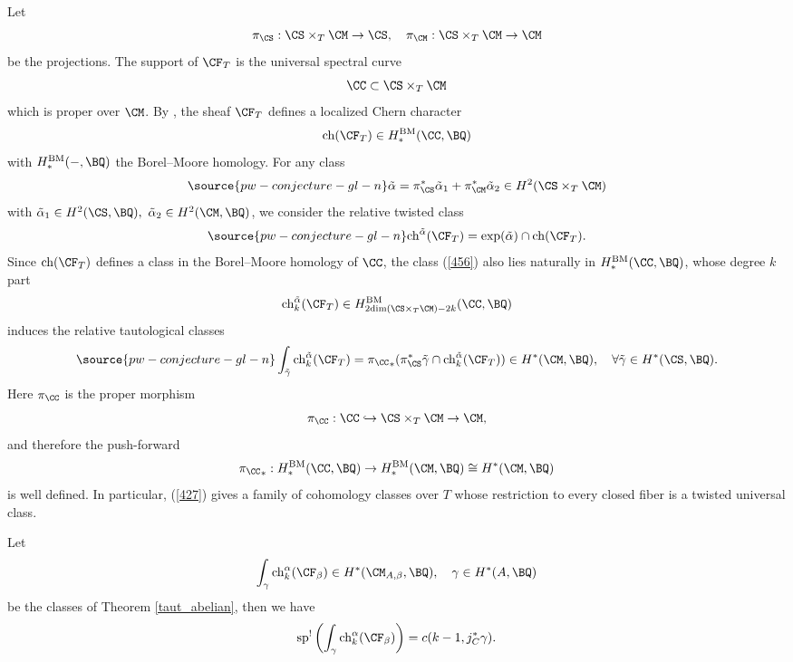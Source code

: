 Let
\[
\pi_\CS: \CS\times_T \CM \to \CS,\quad \pi_\CM: \CS\times_T \CM \to \CM
\]
be the projections. The support of $\CF_T$ is the universal spectral curve
\[
\CC \subset \CS\times_T \CM
\]
which is proper over $\CM$. By \cite{BFM}, the sheaf $\CF_T$ defines a localized Chern character
\[
\mathrm{ch}(\CF_T) \in H^{\mathrm{BM}}_*(\CC, \BQ)
\]
with $H^{\mathrm{BM}}_*(-, \BQ)$ the Borel--Moore homology. For any class
\begin{equation}\label{alphatilde}
\source{pw-conjecture-gl-n}
\tilde{\alpha} = \pi_\CS^* \tilde{\alpha}_1 + \pi_\CM^* \tilde{\alpha}_2 \in H^2(\CS \times_T \CM)
\end{equation}
with $\tilde{\alpha}_1\in H^2(\CS, \BQ),~ \tilde{\alpha}_2\in H^2(\CM, \BQ)$, we consider the relative twisted class
\begin{equation}\label{456}
\source{pw-conjecture-gl-n}
\mathrm{ch}^{\tilde{\alpha}}(\CF_T) = \mathrm{exp}(\tilde{\alpha})\cap \mathrm{ch}(\CF_T).
\end{equation}
Since $\mathrm{ch}(\CF_T)$ defines a class in the Borel--Moore homology of $\CC$, the class (\ref{456}) also lies naturally in $ H^{\mathrm{BM}}_*(\CC, \BQ)$, whose degree $k$ part
\[
 \mathrm{ch}_k^{\tilde{\alpha}}(\CF_T) \in H^{\mathrm{BM}}_{2\mathrm{dim}(\CS\times_T\CM)-2k}(\CC, \BQ)
\]
induces the relative tautological classes
\begin{equation}\label{427}
\source{pw-conjecture-gl-n}
\int_{\tilde{\gamma}} \mathrm{ch}_k^{\tilde{\alpha}}(\CF_T) = {\pi_\CC}_* ( \pi_{\CS}^*\tilde{\gamma} \cap  \mathrm{ch}_k^{\tilde{\alpha}}(\CF_T) ) \in H^*(\CM, \BQ), \quad \forall \tilde{\gamma}\in H^*(\CS, \BQ).
\end{equation}
Here $\pi_\CC$ is the proper morphism
\[
\pi_\CC: \CC \hookrightarrow \CS \times_T \CM \to \CM,
\]
and therefore the push-forward
\[
{\pi_\CC}_*: H^\mathrm{BM}_*(\CC, \BQ) \to H^\mathrm{BM}_*(\CM, \BQ) \cong H^*(\CM, \BQ)
\]
is well defined. In particular, (\ref{427}) gives a family of cohomology classes over $T$ whose restriction to every closed fiber is a twisted universal class.

\begin{prop}
\notready\label{prop4.8}
Let
\[
\int_{\gamma} \mathrm{ch}_k^\alpha (\CF_\beta) \in H^*(\CM_{A,\beta}, \BQ), \quad  \gamma \in H^*(A, \BQ)
\]
be the classes of Theorem \ref{taut_abelian}, then we have
\[
\mathrm{sp}^!\left( \int_{\gamma} \mathrm{ch}_k^\alpha (\CF_\beta) \right) = c(k-1, j_C^*\gamma).
\]
\end{prop}

